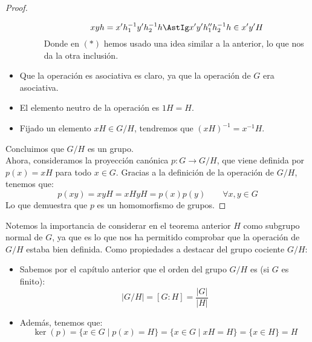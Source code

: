 \begin{teo}
\begin{proof}
\begin{itemize}
\begin{description}
\begin{equation*}
                            xyh = x'h_1^{-1}y'h_2^{-1}h \AstIg x'y'h_1''h_2^{-1}h \in x'y'H
                        \end{equation*}
                        Donde en $(\ast)$ hemos usado una idea similar a la anterior, lo que nos da la otra inclusión.
                \end{description}
            \item Que la operación es asociativa es claro, ya que la operación de $G$ era asociativa.
            \item El elemento neutro de la operación es $1H = H$.
            \item Fijado un elemento $xH \in G/H$, tendremos que ${(xH)}^{-1} = x^{-1}H$.
        \end{itemize}
        Concluimos que $G/H$ es un grupo.\\

        \noindent
        Ahora, consideramos la proyección canónica $p:G\rightarrow G/H$, que viene definida por $p(x) = xH$ para todo $x\in G$. Gracias a la definición de la operación de $G/H$, tenemos que:
        \begin{equation*}
            p(xy) = xyH = xHyH = p(x)p(y) \qquad \forall x,y\in G
        \end{equation*}
        Lo que demuestra que $p$ es un homomorfismo de grupos.
    \end{proof}
\end{teo}

\noindent
Notemos la importancia de considerar en el teorema anterior $H$ como subgrupo normal de $G$, ya que es lo que nos ha permitido comprobar que la operación de $G/H$ estaba bien definida. Como propiedades a destacar del grupo cociente $G/H$:

\begin{itemize}
    \item Sabemos por el capítulo anterior que el orden del grupo $G/H$ es (si $G$ es finito):
        \begin{equation*}
            |G/H| = [G:H] = \dfrac{|G|}{|H|}
        \end{equation*}
    \item Además, tenemos que: 
        \begin{equation*}
            \ker(p) = \{x\in G\mid p(x) = H\} = \{x\in G\mid xH = H\} = \{x\in H\} = H
        \end{equation*}
\end{itemize}

